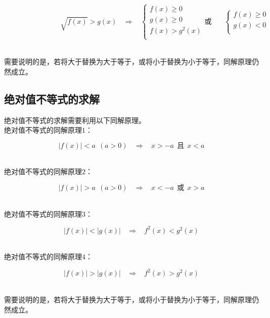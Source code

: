 \documentclass[UTF8]{ctexart}
\begin{document}
    \begin{large}
        \begin{equation*}
            ~~~~~~~~~~~~~~~~~~~~~~~~~~~~~~~~~~~~\sqrt{f(x)}>g(x)~~~~\Rightarrow~~~~
            \begin{cases}
                f(x)\geq 0\\[1mm]
                g(x)\geq 0\\[1mm]
                f(x)>g^2(x)\\[1mm]
            \end{cases}
            \text{或}~~~~~~~~
            \begin{cases}
                f(x)\geq 0\\[1mm]
                g(x)<0\\[1mm]
            \end{cases}
        \end{equation*}
    \end{large}\\
    需要说明的是，若将大于替换为大于等于，或将小于替换为小于等于，同解原理仍然成立。

\newpage

\subsection{绝对值不等式的求解}
    绝对值不等式的求解需要利用以下同解原理。\\[3mm]
    绝对值不等式的同解原理$1$：
    \begin{large}
        \begin{equation*}
            \big|f(x)\big|<a~~(a>0)~~~~\Rightarrow~~~~x>-a~~\text{且}~~x<a
        \end{equation*}
    \end{large}\\
    绝对值不等式的同解原理$2$：
    \begin{large}
        \begin{equation*}
            \big|f(x)\big|>a~~(a>0)~~~~\Rightarrow~~~~x<-a~~\text{或}~~x>a
        \end{equation*}
    \end{large}\\
    绝对值不等式的同解原理$3$：
    \begin{large}
        \begin{equation*}
            \big|f(x)\big|<\big|g(x)\big|~~~~\Rightarrow~~~~f^2(x)<g^2(x)
        \end{equation*}
    \end{large}\\
    绝对值不等式的同解原理$4$：
    \begin{large}
        \begin{equation*}
            \big|f(x)\big|>\big|g(x)\big|~~~~\Rightarrow~~~~f^2(x)>g^2(x)
        \end{equation*}
    \end{large}\\
    需要说明的是，若将大于替换为大于等于，或将小于替换为小于等于，同解原理仍然成立。
\end{document}
